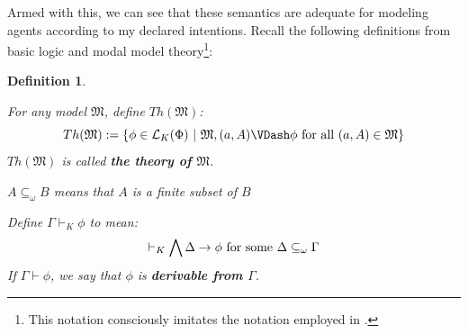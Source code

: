 \documentclass[11pt]{article}
\numberwithin{equation}{subsection}
\newtheorem{mydef}[theorem]{Definition}
\renewcommand{\Omega}{\mathfrak{M}}
\begin{document}
Armed with this, we can see that these semantics are adequate for
modeling agents according to my declared intentions.
Recall the following definitions from basic logic and modal model
theory\footnote{This notation consciously imitates the notation
  employed in \citep{blackburn_modal_2001}.}:
\begin{mydef}\label{basicdefs}
\begin{mynum}
\item\label{basicdefsI} For any model $\Omega$, define $Th(\Omega)$:
\[Th(\Omega) := \{ \phi \in \mathcal{L}_K(\Phi) \ |\ \Omega, (a,A)
\VDash \phi \textup{ for all $(a,A) \in \Omega$}\}\]
$Th(\Omega)$ is called \textbf{the theory of $\Omega$}.

\item\label{basicdefsII} $A \subseteq_\omega B$ means that $A$ is a finite subset of $B$

\item\label{basicdefsIII} Define $\Gamma \vdash_K \phi$ to mean:
\[ \vdash_K \bigwedge \Delta \to \phi \textup{ for some $\Delta
  \subseteq_\omega \Gamma$} \]
If $\Gamma \vdash \phi$, we say that $\phi$ is \textbf{derivable from
  $\Gamma$}.
\end{mynum}
\end{mydef}
\end{document}
